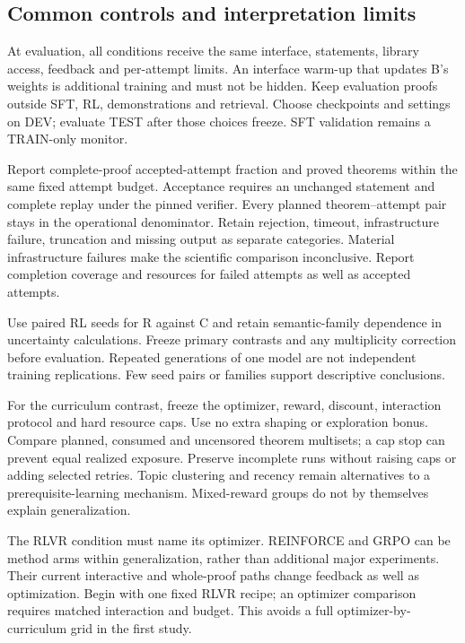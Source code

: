 \documentclass[11pt]{article}
\begin{document}
\subsection{Common controls and interpretation limits}

At evaluation, all conditions receive the same interface, statements, library access, feedback and per-attempt limits.
An interface warm-up that updates B's weights is additional training and must not be hidden.
Keep evaluation proofs outside SFT, RL, demonstrations and retrieval.
Choose checkpoints and settings on DEV; evaluate TEST after those choices freeze.
SFT validation remains a TRAIN-only monitor.

Report complete-proof accepted-attempt fraction and proved theorems within the same fixed attempt budget.
Acceptance requires an unchanged statement and complete replay under the pinned verifier.
Every planned theorem--attempt pair stays in the operational denominator.
Retain rejection, timeout, infrastructure failure, truncation and missing output as separate categories.
Material infrastructure failures make the scientific comparison inconclusive.
Report completion coverage and resources for failed attempts as well as accepted attempts.

Use paired RL seeds for R against C and retain semantic-family dependence in uncertainty calculations.
Freeze primary contrasts and any multiplicity correction before evaluation.
Repeated generations of one model are not independent training replications.
Few seed pairs or families support descriptive conclusions.

For the curriculum contrast, freeze the optimizer, reward, discount, interaction protocol and hard resource caps.
Use no extra shaping or exploration bonus.
Compare planned, consumed and uncensored theorem multisets; a cap stop can prevent equal realized exposure.
Preserve incomplete runs without raising caps or adding selected retries.
Topic clustering and recency remain alternatives to a prerequisite-learning mechanism.
Mixed-reward groups do not by themselves explain generalization.

The RLVR condition must name its optimizer.
REINFORCE and GRPO can be method arms within generalization, rather than additional major experiments.
Their current interactive and whole-proof paths change feedback as well as optimization.
Begin with one fixed RLVR recipe; an optimizer comparison requires matched interaction and budget.
This avoids a full optimizer-by-curriculum grid in the first study.
\end{document}
